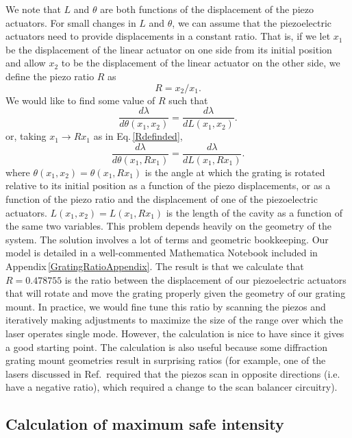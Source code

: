 We note that $L$ and $\theta$ are both functions of the displacement of the piezo actuators. For small changes in $L$ and $\theta$, we can assume that the piezoelectric actuators need to provide displacements in a constant ratio. That is, if we let $x_1$ be the displacement of the linear actuator on one side from its initial position and allow $x_2$ to be the displacement of the linear actuator on the other side, we define the piezo ratio $R$ as 
\begin{equation}
\label{Rdefinded}
R=x_2/x_1.
\end{equation}
We would like to find some value of $R$ such that
\begin{equation}
    \frac{d\lambda}{d \theta(x_1,x_2)}= \frac{d \lambda}{d L(x_1,x_2)}.
\end{equation}
or, taking $x_1\rightarrow R x_1$ as in Eq.\,\ref{Rdefinded},
\begin{equation}
    \frac{d\lambda}{d \theta(x_1,R x_1)}= \frac{d \lambda}{d L(x_1,R x_1)}.
\end{equation}
where $\theta(x_1,x_2)=\theta(x_1,R x_1)$ is the angle at which the grating is rotated relative to its initial position as a function of the piezo displacements, or as a function of the piezo ratio and the displacement of one of the piezoelectric actuators. $L(x_1, x_2)=L(x_1,R x_1)$ is the length of the cavity as a function of the same two variables.
This problem depends heavily on the geometry of the system. The solution involves a lot of terms and geometric bookkeeping. Our model is detailed in a well-commented Mathematica Notebook included in Appendix\,\ref{GratingRatioAppendix}. The result is that we calculate that $R=0.478755$ is the ratio between the displacement of our piezoelectric actuators that will rotate and move the grating properly given the geometry of our grating mount. In practice, we would fine tune this ratio by scanning the piezos and iteratively making adjustments to maximize the size of the range over which the laser operates single mode. However, the calculation is nice to have since it gives a good starting point. The calculation is also useful because some diffraction grating mount geometries result in surprising ratios (for example, one of the lasers discussed in Ref.\,\cite{cjeDiss} required that the piezos scan in opposite directions (i.e. have a negative ratio), which required a change to the scan balancer circuitry).



\subsection{Calculation of maximum safe intensity}

